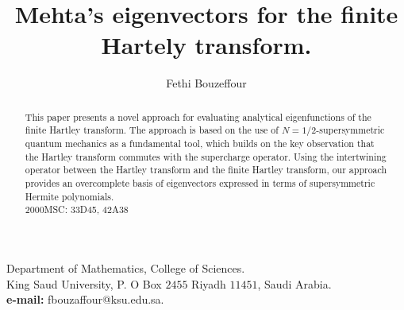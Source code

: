 \documentclass[12 pt]{amsart}
\numberwithin{equation}{section}
\begin{document}
\title{Mehta's eigenvectors
for the finite Hartely transform. }

\author{Fethi Bouzeffour}

\date{}

\maketitle
\begin{center}
 Department of Mathematics, College of Sciences.\\
 King Saud University, P. O Box $2455$ Riyadh $11451$, Saudi Arabia.\\
     \textbf{ e-mail:} fbouzaffour@ksu.edu.sa.
\end{center}

\begin{abstract}
This paper presents a novel  approach for evaluating  analytical eigenfunctions of the finite Hartley transform. The approach is based on the use of $N=1/2$-supersymmetric quantum mechanics as a fundamental tool, which builds on the key observation that the Hartley transform commutes with the supercharge operator. Using the intertwining operator between the Hartley transform and the finite Hartley transform, our approach provides an overcomplete basis of eigenvectors expressed in terms of supersymmetric Hermite polynomials.\\
\noindent 2000MSC: 33D45, 42A38
\end{abstract}
\end{document}
